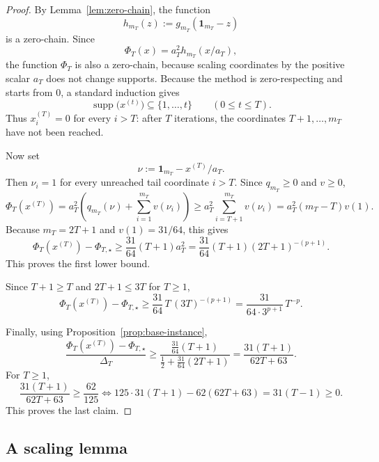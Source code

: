 \documentclass[11pt]{article}
\newcommand{\supp}{\operatorname{supp}}
\newcommand{\one}{\mathbf{1}}
\begin{document}
\begin{proof}
By Lemma~\ref{lem:zero-chain}, the function
\[
h_{m_T}(z):=g_{m_T}(\one_{m_T}-z)
\]
is a zero-chain.
Since
	\[
	\Phi_T(x)=a_T^2 h_{m_T}(x/a_T),
	\]
	the function $\Phi_T$ is also a zero-chain, because scaling coordinates by the positive scalar $a_T$ does not change supports.
Because the method is zero-respecting and starts from \(0\), a standard induction gives
	\[
	\supp\bigl(x^{(t)}\bigr)\subseteq \{1,\ldots,t\}
	\qquad (0\le t\le T).
	\]
Thus \(x^{(T)}_i=0\) for every \(i>T\): after \(T\) iterations, the coordinates \(T+1,\ldots,m_T\) have not been reached.

Now set
\[
\nu:=\one_{m_T}-x^{(T)}/a_T.
\]
Then \(\nu_i=1\) for every unreached tail coordinate \(i>T\).
Since $q_{m_T}\ge 0$ and $v\ge 0$,
\[
\Phi_T(x^{(T)})
=
a_T^2\left(q_{m_T}(\nu)+\sum_{i=1}^{m_T}v(\nu_i)\right)
\ge
a_T^2\sum_{i=T+1}^{m_T}v(\nu_i)
=
a_T^2(m_T-T)v(1).
\]
Because $m_T=2T+1$ and $v(1)=31/64$, this gives
\[
\Phi_T(x^{(T)})-\Phi_{T,\star}
\ge
\frac{31}{64}(T+1)a_T^2
=
\frac{31}{64}(T+1)(2T+1)^{-(p+1)}.
\]
This proves the first lower bound.

Since $T+1\ge T$ and $2T+1\le 3T$ for $T\ge 1$,
\[
\Phi_T(x^{(T)})-\Phi_{T,\star}
\ge
\frac{31}{64}\,T\,(3T)^{-(p+1)}
=
\frac{31}{64\cdot 3^{p+1}}\,T^{-p}.
\]

\noindent Finally, using Proposition~\ref{prop:base-instance},
\[
\frac{\Phi_T(x^{(T)})-\Phi_{T,\star}}{\Delta_T}
\ge
\frac{\frac{31}{64}(T+1)}{\frac12+\frac{31}{64}(2T+1)}
=
\frac{31(T+1)}{62T+63}.
\]
For $T\ge 1$,
\[
\frac{31(T+1)}{62T+63}\ge \frac{62}{125}
\iff
125\cdot 31(T+1)-62(62T+63)=31(T-1)\ge 0.
\]
This proves the last claim.
\end{proof}

\subsection{A scaling lemma}
\label{app:det-scaling}
\end{document}

